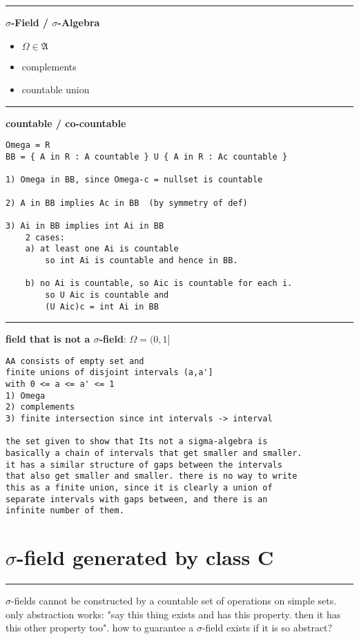\documentclass{article}
\begin{document}
\begin{flushleft}
\bigbreak
\hrule
\bigbreak
\textbf{$\sigma$-Field / $\sigma$-Algebra}

\begin{itemize}
    \item $\Omega \in \mathfrak{A}$
    \item complements 
    \item countable union
\end{itemize}

\bigbreak
\hrule
\bigbreak
\textbf{countable / co-countable}

\begin{verbatim}
Omega = R
BB = { A in R : A countable } U { A in R : Ac countable }

1) Omega in BB, since Omega-c = nullset is countable

2) A in BB implies Ac in BB  (by symmetry of def)

3) Ai in BB implies int Ai in BB
    2 cases:
    a) at least one Ai is countable 
        so int Ai is countable and hence in BB.

    b) no Ai is countable, so Aic is countable for each i. 
        so U Aic is countable and
        (U Aic)c = int Ai in BB
\end{verbatim}

\bigbreak
\hrule
\bigbreak
\textbf{field that is not a $\sigma$-field}: $\Omega = (0,1]$

\begin{verbatim}
AA consists of empty set and 
finite unions of disjoint intervals (a,a'] 
with 0 <= a <= a' <= 1    
1) Omega
2) complements
3) finite intersection since int intervals -> interval 

the set given to show that Its not a sigma-algebra is 
basically a chain of intervals that get smaller and smaller.
it has a similar structure of gaps between the intervals 
that also get smaller and smaller. there is no way to write
this as a finite union, since it is clearly a union of 
separate intervals with gaps between, and there is an 
infinite number of them.
\end{verbatim}

\section*{$\sigma$-field generated by class C}
\bigbreak
\hrule
\bigbreak

$\sigma$-fields cannot be constructed by a countable set of operations on simple sets. only abstraction works: "say this thing exists and has this property. then it has this other property too". how to guarantee a $\sigma$-field exists if it is so abstract?


\end{flushleft}
\end{document}
